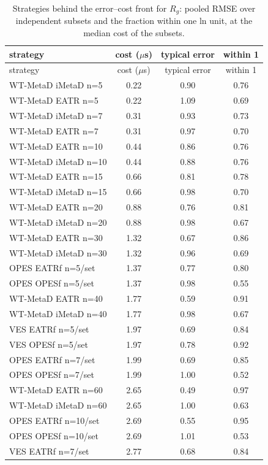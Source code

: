 \begin{longtable}{lccc}
\caption{Strategies behind the error--cost front for $R_g$: pooled RMSE over independent subsets and the fraction within one ln unit, at the median cost of the subsets.}\label{tab:s10Rg}\\
\toprule
strategy & cost ($\mu$s) & typical error & within 1\\ \midrule
\endfirsthead
\toprule
strategy & cost ($\mu$s) & typical error & within 1\\ \midrule
\endhead
\bottomrule
\endfoot
WT-MetaD iMetaD n=5 & 0.22 & 0.90 & 0.76 \\
WT-MetaD EATR n=5 & 0.22 & 1.09 & 0.69 \\
WT-MetaD iMetaD n=7 & 0.31 & 0.93 & 0.73 \\
WT-MetaD EATR n=7 & 0.31 & 0.97 & 0.70 \\
WT-MetaD EATR n=10 & 0.44 & 0.86 & 0.76 \\
WT-MetaD iMetaD n=10 & 0.44 & 0.88 & 0.76 \\
WT-MetaD EATR n=15 & 0.66 & 0.81 & 0.78 \\
WT-MetaD iMetaD n=15 & 0.66 & 0.98 & 0.70 \\
WT-MetaD EATR n=20 & 0.88 & 0.76 & 0.81 \\
WT-MetaD iMetaD n=20 & 0.88 & 0.98 & 0.67 \\
WT-MetaD EATR n=30 & 1.32 & 0.67 & 0.86 \\
WT-MetaD iMetaD n=30 & 1.32 & 0.96 & 0.69 \\
OPES EATRf n=5/set & 1.37 & 0.77 & 0.80 \\
OPES OPESf n=5/set & 1.37 & 0.98 & 0.55 \\
WT-MetaD EATR n=40 & 1.77 & 0.59 & 0.91 \\
WT-MetaD iMetaD n=40 & 1.77 & 0.98 & 0.67 \\
VES EATRf n=5/set & 1.97 & 0.69 & 0.84 \\
VES OPESf n=5/set & 1.97 & 0.78 & 0.92 \\
OPES EATRf n=7/set & 1.99 & 0.69 & 0.85 \\
OPES OPESf n=7/set & 1.99 & 1.00 & 0.52 \\
WT-MetaD EATR n=60 & 2.65 & 0.49 & 0.97 \\
WT-MetaD iMetaD n=60 & 2.65 & 1.00 & 0.63 \\
OPES EATRf n=10/set & 2.69 & 0.55 & 0.95 \\
OPES OPESf n=10/set & 2.69 & 1.01 & 0.53 \\
VES EATRf n=7/set & 2.77 & 0.68 & 0.84 \\

\end{longtable}

